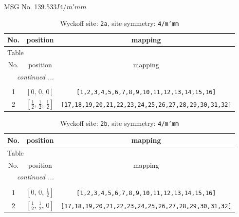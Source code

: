 \documentclass[fleqn,8pt]{jsarticle}
\begin{document}
\setcounter{MaxMatrixCols}{32}

\renewcommand{\tablename}{Table~}
\renewcommand{\figurename}{Figure~}
\begin{center}
\LARGE
MSG No. 139.533\quad$I4/m'mm$
\end{center}
\renewcommand{\arraystretch}{1.2}
\begin{longtable}{ccc}
\caption{Wyckoff site: {\tt 2a}, site symmetry: {\tt 4/m'mm}}
 \\
 \hline \hline
No. & position & mapping \\ \hline \endfirsthead

\multicolumn{2}{l}{\tablename\ \thetable{}} \\
 \hline \hline
No. & position & mapping \\ \hline \endhead

 \hline \hline
\multicolumn{2}{r}{\footnotesize\it continued ...} \\ \endfoot

 \hline \hline
\multicolumn{2}{r}{} \\ \endlastfoot

1 & $\left[ 0,\, 0,\, 0 \right]$ & {\tt [1,2,3,4,5,6,7,8,9,10,11,12,13,14,15,16]} \\ \hline
2 & $\left[ \frac{1}{2},\, \frac{1}{2},\, \frac{1}{2} \right]$ & {\tt [17,18,19,20,21,22,23,24,25,26,27,28,29,30,31,32]} \\
\end{longtable}
\renewcommand{\arraystretch}{1.2}
\begin{longtable}{ccc}
\caption{Wyckoff site: {\tt 2b}, site symmetry: {\tt 4/m'mm}}
 \\
 \hline \hline
No. & position & mapping \\ \hline \endfirsthead

\multicolumn{2}{l}{\tablename\ \thetable{}} \\
 \hline \hline
No. & position & mapping \\ \hline \endhead

 \hline \hline
\multicolumn{2}{r}{\footnotesize\it continued ...} \\ \endfoot

 \hline \hline
\multicolumn{2}{r}{} \\ \endlastfoot

1 & $\left[ 0,\, 0,\, \frac{1}{2} \right]$ & {\tt [1,2,3,4,5,6,7,8,9,10,11,12,13,14,15,16]} \\ \hline
2 & $\left[ \frac{1}{2},\, \frac{1}{2},\, 0 \right]$ & {\tt [17,18,19,20,21,22,23,24,25,26,27,28,29,30,31,32]} \\
\end{longtable}
\end{document}
